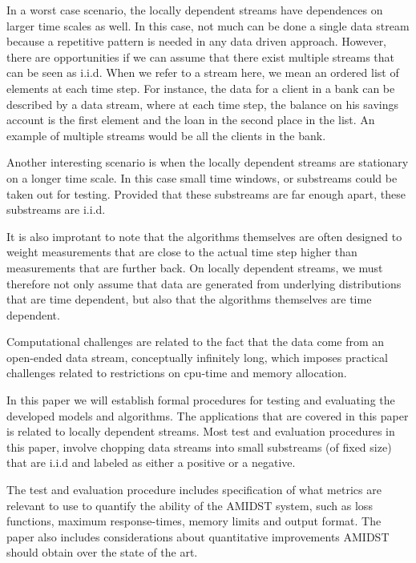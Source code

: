 
In a worst case scenario, the locally dependent streams have dependences on larger time scales as well.  In this case, not much can be done a single data stream because a repetitive pattern is needed in any data driven approach.  However, there are opportunities if we can assume that there exist multiple streams that can be seen as i.i.d.  When we refer to a stream here, we mean an ordered list of elements at each time step.  For instance, the data for a client in a bank can be described by a data stream, where at each time step, the balance on his savings account is the first element and the loan in the second place in the list.  An example of multiple streams would be all the clients in the bank.   

Another interesting scenario is when the locally dependent streams are stationary on a longer time scale.  In this case small time windows, or substreams could be taken out for testing.  Provided that these substreams are far enough apart, these substreams are i.i.d.  

It is also improtant to note that the algorithms themselves are often designed to weight measurements that are close to the actual time step higher than measurements that are further back.  On locally dependent streams, we must therefore not only assume that data are generated from underlying distributions that are time dependent, but also that the algorithms themselves are time dependent.  

Computational challenges are related to the fact that the data come from an open-ended data stream, conceptually infinitely long, which imposes practical challenges related to restrictions on cpu-time and memory allocation.  


In this paper we will establish formal procedures for testing and evaluating the developed models and algorithms. The applications that are covered in this paper is related to locally dependent streams.  Most test and evaluation procedures in this paper, involve chopping data streams into small substreams (of fixed size) that are i.i.d and labeled as either a positive or a negative. 

The test and evaluation procedure includes specification of what metrics are relevant to use to quantify the ability of the AMIDST system, such as loss functions, maximum response-times, memory limits and output format.  The paper also includes considerations about quantitative improvements AMIDST should obtain over the state of the art.

